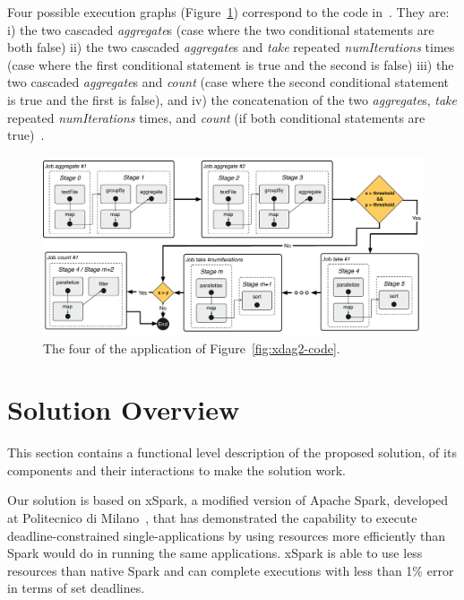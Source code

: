 Four possible execution graphs (Figure~\ref{fig:xdag2}) correspond to the code in~. They are: i) the two cascaded \textit{aggregate}s  (case where the two conditional statements are both false) ii) the two cascaded \textit{aggregate}s and \textit{take} repeated \textit{numIterations} times (case where the first conditional statement is true and the second is false) iii) the two cascaded \textit{aggregate}s and \textit{count} (case where the second conditional statement is true and the first is false), and iv) the concatenation of the two \textit{aggregate}s, \textit{take} repeated \textit{numIterations} times, and \textit{count} (if both conditional statements are  true)~\cite{Baresi-Quattrocchi-Denaro:2019}.

\begin{figure}[t]
	\centering
	\includegraphics[width=\columnwidth]{images/xdag2.pdf}
	\caption{The four  \plans of the application of Figure~\ref{fig:xdag2-code}.}
	\label{fig:xdag2}
\end{figure}

\section{Solution Overview}\label{sec:solution_overview}
This section contains a functional level description of the proposed solution, of its components and their interactions to make the solution work.

Our solution is based on xSpark, a modified version of Apache Spark, developed at Politecnico di Milano~\cite{xsparkreport, Quattrocchi2018}, that has demonstrated the capability to execute deadline-constrained single-\plan applications by using resources more efficiently than  Spark would do in running the same applications. xSpark is able to use less resources than native Spark and can complete executions with less than 1\% error in terms of set deadlines.

